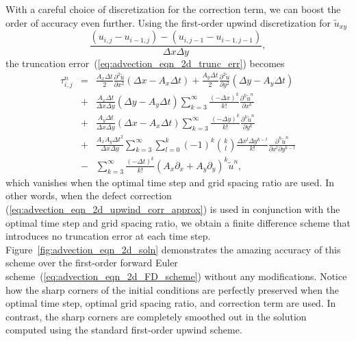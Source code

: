 \documentclass[fleqn,12pt,twoside]{article}
\newcommand{\beq}{\begin{equation}}
\newcommand{\eeq}{\end{equation}}
\newcommand{\bea}{\begin{eqnarray}}
\newcommand{\eea}{\end{eqnarray}}
\def\px{\partial x}
\def\py{\partial y}
\def\tu{\tilde{u}}
\def\dt{\Delta t}
\def\dx{\Delta x}
\def\dy{\Delta y}
\begin{document}
With a careful choice of discretization for the correction term, we can
boost the order of accuracy even further.  Using the first-order upwind 
discretization for $\tu_{xy}$
\beq
   \frac{ \left(u_{i,j} - u_{i-1,j}\right) 
        - \left(u_{i,j-1} - u_{i-1,j-1}\right)}
        {\dx \dy},
  \label{eq:advection_eqn_2d_upwind_corr_approx}
\eeq
the truncation error~(\ref{eq:advection_eqn_2d_trunc_err}) becomes
\bea
  \tau^{n}_{i,j} &=&
      \frac{A_x \dt}{2} \frac{\partial^2 \tu}{\px^2}
      \left( \dx - A_x \dt \right)
    + \frac{A_y \dt}{2} \frac{\partial^2 \tu}{\py^2}
      \left( \dy - A_y \dt \right)
   \nonumber \\
   &+& \frac{A_x\dt}{\dx \dy} ( \dy - A_y \dt )
       \sum_{k=3}^\infty \frac{\left( -\dx \right)^k}{k!} 
              \frac{\partial^k \tu^n}{\px^k} 
   \nonumber \\
   &+& \frac{A_y\dt}{\dx \dy} ( \dx - A_x \dt )
       \sum_{k=3}^\infty \frac{\left( -\dy \right)^k}{k!} 
              \frac{\partial^k \tu^n}{\py^k} 
   \nonumber \\
   &+& \frac{A_x A_y\dt^2}{\dx \dy} 
       \sum_{k=3}^\infty \sum_{l=0}^{k}
              (-1)^k {k \choose l}
              \frac{\dx^l \dy^{k-l}}{k!} 
              \frac{\partial^k \tu^n}{\px^l \py^{k-l}} 
   \nonumber \\
   &-& \sum_{k=3}^\infty \frac{\left( -\dt \right)^k}{k!} 
       \left( A_x \partial_x + A_y \partial_y
              \right)^k \tu^{n} 
  \label{eq:advection_eqn_2d_trunc_err_mod},
\eea
which vanishes when the optimal time step and grid spacing ratio are used.
In other words, when the defect correction 
(\ref{eq:advection_eqn_2d_upwind_corr_approx}) is used 
in conjunction with the optimal time step and grid spacing ratio, we obtain
a finite difference scheme that introduces no truncation error at each time 
step.  Figure~\ref{fig:advection_eqn_2d_soln} demonstrates the amazing accuracy 
of this scheme over the first-order forward Euler 
scheme~(\ref{eq:advection_eqn_2d_FD_scheme}) without any modifications.
Notice how the sharp corners of the initial conditions are perfectly 
preserved when the optimal time step, optimal grid spacing ratio, and 
correction term are used.  In contrast, the sharp corners are
completely smoothed out in the solution computed using the standard 
first-order upwind scheme. 
\end{document}
